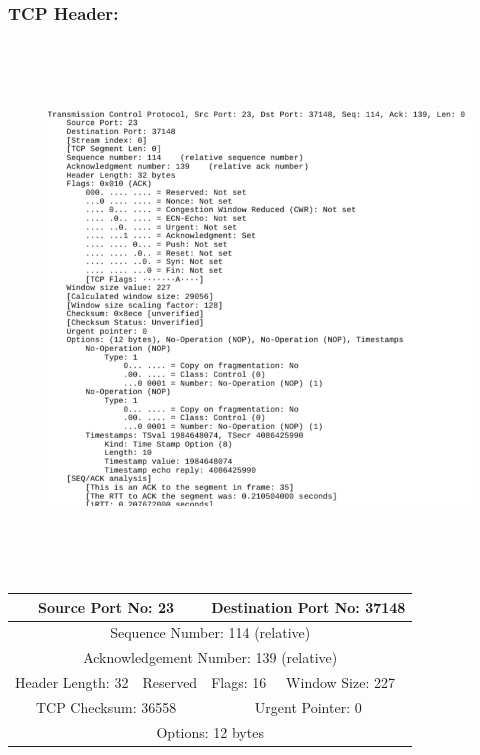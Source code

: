 \documentclass[]{report}
\begin{document}
\subsubsection{TCP Header: }
\begin{figure}[H]
	\vspace{0pt}
	\includegraphics[height=400pt, keepaspectratio, center]{Snapshots/exe6/tcp.png}
\end{figure}
\begin{tabular}{ |p{3cm}|p{3cm}|p{3cm}|p{3cm}|  }
	\hline
	\multicolumn{2}{|c|}{Source Port No: 23} & \multicolumn{2}{|c|}{Destination Port No: 37148} \\
	\hline
	\multicolumn{4}{|c|}{Sequence Number: 114 (relative)} \\
	\hline
	\multicolumn{4}{|c|}{Acknowledgement Number: 139 (relative)} \\
	\hline 
	Header Length: 32 & Reserved & Flags: 16 & Window Size: 227 \\
	\hline
	\multicolumn{2}{|c|}{TCP Checksum: 36558} & \multicolumn{2}{|c|}{Urgent Pointer: 0} \\
	\hline
	\multicolumn{4}{|c|}{Options: 12 bytes} \\
	\hline
\end{tabular}
\end{document}
